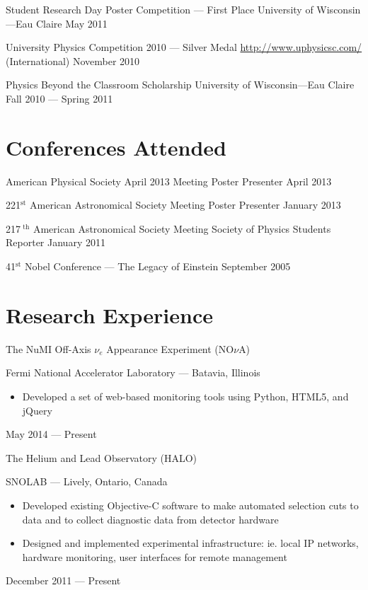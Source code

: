\documentclass{cv}
\begin{document}
\begin{resume}
\object
{Student Research Day Poster Competition --- First Place}
{University of Wisconsin---Eau Claire}
{May 2011}


\object
{University Physics Competition 2010 --- Silver Medal}
{\href{http://www.uphysicsc.com/}{http://www.uphysicsc.com/} (International)}
{November 2010}


\object
{Physics Beyond the Classroom Scholarship}
{University of Wisconsin---Eau Claire}
{Fall 2010 --- Spring 2011}



\section{Conferences Attended}



\object
{American Physical Society April 2013 Meeting}
{Poster Presenter}
{April 2013}


\object
{221$^\text{st}$ American Astronomical Society Meeting}
{Poster Presenter}
{January 2013}


\object
{217$^\text{ th}$ American Astronomical Society Meeting}
{Society of Physics Students Reporter}
{January 2011}


\object
{41$^\text{st}$ Nobel Conference --- The Legacy of Einstein}
{}
{September 2005}



\newpage

\section{Research Experience}

\object
{The NuMI Off-Axis $\nu_e$ Appearance Experiment (NO$\nu$A)}
{Fermi National Accelerator Laboratory --- Batavia, Illinois \noemph
\begin{itemize}
	\item Developed a set of web-based monitoring tools using Python, HTML5, and jQuery
\end{itemize}
}
{May 2014 --- Present}

\object
{The Helium and Lead Observatory (HALO)}
{SNOLAB --- Lively, Ontario, Canada \noemph
	\begin{itemize}
		\item Developed existing Objective-C software to make automated selection cuts to data and to collect diagnostic data from detector hardware
		\item Designed and implemented experimental infrastructure: ie. local IP networks, hardware monitoring, user interfaces for remote management
	\end{itemize}
 }
{December 2011 --- Present}



\end{resume}
\end{document}
